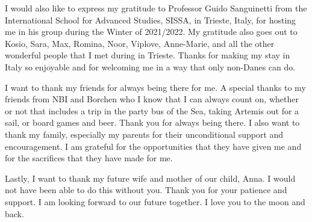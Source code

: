 I would also like to express my gratitude to Professor Guido Sanguinetti from the International School for Advanced Studies, SISSA, in Trieste, Italy, for hosting me in his group during the Winter of 2021/2022. My gratitude also goes out to Kosio, Sara, Max, Romina, Noor, Viplove, Anne-Marie, and all the other wonderful people that I met during in Trieste. Thanks for making my stay in Italy so enjoyable and for welcoming me in a way that only non-Danes can do.

I want to thank my friends for always being there for me. A special thanks to my friends from NBI and Borchen who I know that I can always count on, whether or not that includes a trip in the party bus of the Sea, taking Artemis out for a sail, or board games and beer. Thank you for always being there. I also want to thank my family, especially my parents for their unconditional support and encouragement. I am grateful for the opportunities that they have given me and for the sacrifices that they have made for me.

Lastly, I want to thank my future wife and mother of our child, Anna. I would not have been able to do this without you. Thank you for your patience and support. I am looking forward to our future together. I love you to the moon and back.